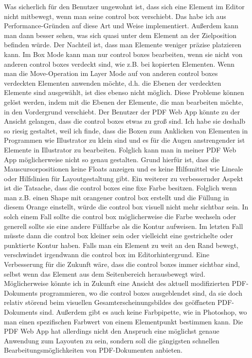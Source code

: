 Was sicherlich für den Benutzer ungewohnt ist, dass sich eine Element im Editor nicht mitbewegt, wenn man seine control box verschiebt. Das habe ich aus Performance-Gründen auf diese Art und Weise implementiert. Außerdem kann man dann besser sehen, was sich quasi unter dem Element an der Zielposition befinden würde. Der Nachteil ist, dass man Elemente weniger präzise platzieren kann. Im Box Mode kann man nur control boxes bearbeiten, wenn sie nicht von anderen control boxes verdeckt sind, wie z.B. bei kopierten Elementen. Wenn man die Move-Operation im Layer Mode auf von anderen control boxes verdeckten Elementen anwenden möchte, d.h. die Ebenen der verdeckten Elemente sind ausgewählt, ist dies ebenso nicht möglich. Diese Probleme können gelöst werden, indem mit die Ebenen der Elemente, die man bearbeiten möchte, in den Vordergrund verschiebt. Der Benutzer der PDF Web App könnte zu der Ansicht gelangen, dass die control boxes etwas zu groß sind. Ich habe sie deshalb so riesig gestaltet, weil ich finde, dass die Boxen zum Anklicken von Elementen in Programmen wie Illustrator zu klein sind und es für die Augen anstrengender ist Elemente in Illustrator zu bearbeiten. Folglich kann man in meiner PDF Web App möglicherweise nicht so genau gestalten. Grund hierfür ist, dass die Mauscursorpositionen keine Floats anzeigen und es keine Hilfsmittel wie Lineale oder Hilfslinien für Layoutgestaltung gibt. Ein weiterer zu verbessernder Aspekt ist die Tatsache, dass die control boxes eine fixe Farbe besitzen. Folglich wenn man z.B. einen Shape mit orangener control box erstellt und die Füllung in diesem Orange einstellt, würde die control box visuell nicht mehr sichtbar sein. In solch einem Fall sollte die control box möglicherweise die Farbe wechseln oder generell sollte sie eine andere Füllfarbe als die Kontur aufweisen. Im letzten Fall müsste dann die control box kleiner sein oder vielleicht eine gestrichelte oder punktierte Kontur haben. Falls man ein Element zu weit an den Rand bewegt, verschwindet irgendwann die control box im Editorhintergrund. Eine Verbesserung für die Zukunft wäre, dass die control boxes immer sichtbar sind, selbst wenn das Element aus dem Seitenbereich herausbewegt wird. Möglicherweise könnte ich in Zukunft eine Ansicht des aktuell modifizierten PDF-Dokuments programmieren, wo die control boxes ausgeblendet sind, da sie doch relativ störend beim visuellen Gesamterscheinungsbildes des geöffneten PDF-Dokuments sind. Außerdem gibt es auch keine Farbpipette, wie in Photoshop, wo man einen spezifischen Farbwert von einem Elementpunkt bestimmen kann. Die PDF Web App hat allerdings nicht den Anspruch eine möglichst genaue Anwendung zum Layouten zu sein, sondern soll die gängigsten schnellen Bearbeitungsmöglichkeiten von PDF-Dokumenten anbieten.
